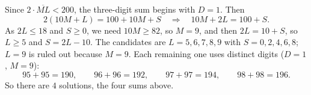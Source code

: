 Since $2\cdot\overline{ML}<200$, the three-digit sum begins with $D=1$. Then
\[
2(10M+L)=100+10M+S\quad\Longrightarrow\quad 10M+2L=100+S .
\]
As $2L\le18$ and $S\ge0$, we need $10M\ge82$, so $M=9$, and then $2L=10+S$, so $L\ge5$ and $S=2L-10$. The candidates are $L=5,6,7,8,9$ with $S=0,2,4,6,8$; $L=9$ is ruled out because $M=9$. Each remaining one uses distinct digits ($D=1$, $M=9$):
\[
95+95=190,\qquad 96+96=192,\qquad 97+97=194,\qquad 98+98=196 .
\]
So there are $\boxed{4}$ solutions, the four sums above.
